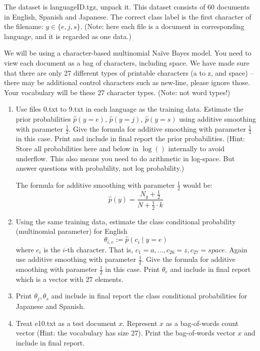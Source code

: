 \documentclass[a4paper]{article}
\theoremstyle{definition}
\newenvironment{soln}{
    \leavevmode\color{blue}\ignorespaces
}{}
\begin{document}
The dataset is languageID.tgz, unpack it.
This dataset consists of 60 documents in English, Spanish and Japanese. 
The correct class label is the first character of the filename: $y \in \{e, j, s\}$. (Note: here each file is a document in corresponding language, and it is regarded as one data.)

We will be using a character-based multinomial Naïve Bayes model.  You need to view each document as a bag of characters, including space.  We have made sure that there are only 27 different types of printable characters (a to z, and space) -- there may be additional control characters such as new-line, please ignore those.  Your vocabulary will be these 27 character types. (Note: not word types!)


\begin{enumerate}
\item
Use files 0.txt to 9.txt in each language as the training data.
Estimate the prior probabilities 
$\hat p(y=e)$,
$\hat p(y=j)$,
$\hat p(y=s)$
using additive smoothing with parameter $\frac{1}{2}$. 
Give the formula for additive smoothing with parameter $\frac{1}{2}$ in this case. 
Print and include in final report the prior probabilities.
(Hint: Store all probabilities here and below in $\log()$ internally to avoid underflow. This also means you need to do arithmetic in log-space.  But answer questions with probability, not log probability.)

\begin{soln}
    The formula for additive smoothing with parameter $\frac{1}{2}$ would be:
        $$\hat p(y) = \frac{N_y + \frac{1}{2}}{N + \frac{1}{2} \cdot k}$$
\end{soln}

\item
Using the same training data, estimate the class conditional probability (multinomial parameter) for English
$$\theta_{i,e} := \hat p(c_i \mid y=e)$$ 
where $c_i$ is the $i$-th character. That is, $c_1 = a, \ldots, c_{26} = z, c_{27} = space$.
Again use additive smoothing with parameter $\frac{1}{2}$.
Give the formula for additive smoothing with parameter $\frac{1}{2}$ in this case. 
Print $\theta_e$ and include in final report which is a vector with 27 elements.


\item
Print $\theta_j, \theta_s$ and include in final report the class conditional probabilities for Japanese and Spanish.

\item
Treat e10.txt as a test document $x$.
Represent $x$ as a bag-of-words count vector (Hint: the vocabulary has size 27).
Print the bag-of-words vector $x$ and include in final report.


\end{enumerate}
\end{document}
